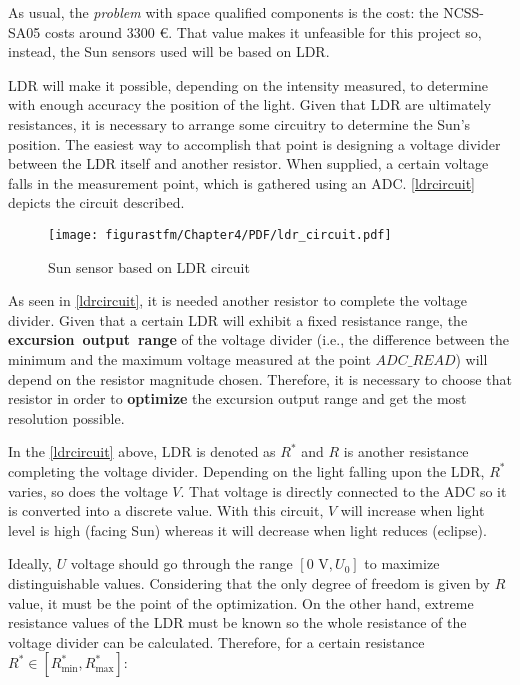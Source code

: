 As usual, the \textit{problem} with space qualified components is the cost: the NCSS-SA05 costs around 3300 €. That value makes it unfeasible for this project so, instead, the Sun sensors used will be based on \acrshort{LDR}. 

\acrshort{LDR} will make it possible, depending on the intensity measured, to determine with enough accuracy the position of the light. Given that \acrshort{LDR} are ultimately resistances, it is necessary to arrange some circuitry to determine the Sun's position. The easiest way to accomplish that point is designing a voltage divider between the \acrshort{LDR} itself and another resistor. When supplied, a certain voltage falls in the measurement point, which is gathered using an \acrshort{ADC}. \autoref{ldrcircuit} depicts the circuit described.


\begin{figure} [H]
			\centering
			\texttt{[image: figurastfm/Chapter4/PDF/ldr\_circuit.pdf]}
			\caption{Sun sensor based on \acrshort{LDR} circuit} \label{ldrcircuit}
			\vspace{-2cm}
\end{figure}

As seen in \autoref{ldrcircuit}, it is needed another resistor to complete the voltage divider. Given that a certain \acrshort{LDR} will exhibit a fixed resistance range, the \textbf{excursion~output~range} of the voltage divider (i.e., the difference between the minimum and the maximum voltage measured at the point $ADC\_READ$) will depend on the resistor magnitude chosen. Therefore, it is necessary to choose that resistor in order to \textbf{optimize} the excursion output range and get the most resolution possible.

In the \autoref{ldrcircuit} above, \acrshort{LDR} is denoted as $R^*$ and $R$ is another resistance completing the voltage divider. Depending on the light falling upon the \acrshort{LDR}, $R^*$ varies, so does the voltage $V$. That voltage is directly connected to the \acrshort{ADC} so it is converted into a discrete value. With this circuit, $V$ will increase when light level is high (facing Sun) whereas it will decrease when light reduces (eclipse). 

Ideally, $U$ voltage should go through the range $[0 \text{ V},U_0]$ to maximize distinguishable values. Considering that the only degree of freedom is given by $R$ value, it must be the point of the optimization. On the other hand, extreme resistance values of the \acrshort{LDR} must be known so the whole resistance of the voltage divider can be calculated. Therefore, for a certain resistance $R^* \in [R^*_{\text{min}}, R^*_{\text{max}}]$:

